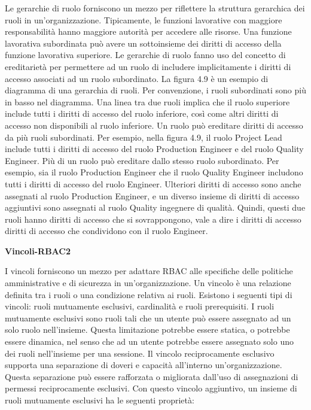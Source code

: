 Le gerarchie di ruolo forniscono un mezzo per riflettere la struttura gerarchica dei ruoli in un'organizzazione. Tipicamente, le funzioni lavorative con maggiore responsabilità hanno maggiore autorità per accedere alle risorse. Una funzione lavorativa subordinata può avere un sottoinsieme dei diritti di accesso della funzione lavorativa superiore. Le gerarchie di ruolo fanno uso del concetto di ereditarietà per permettere ad un ruolo di includere implicitamente i diritti di accesso associati ad un ruolo subordinato. La figura 4.9 è un esempio di diagramma di una gerarchia di ruoli. Per convenzione, i ruoli subordinati sono più in basso nel diagramma. Una linea tra due ruoli implica che il ruolo superiore include tutti i diritti di accesso del ruolo inferiore, così come altri diritti di accesso non disponibili al ruolo inferiore. Un ruolo può ereditare diritti di accesso da più ruoli subordinati. Per esempio, nella figura 4.9, il ruolo Project Lead include tutti i diritti di accesso del ruolo Production Engineer e del ruolo Quality Engineer. Più di un ruolo può ereditare dallo stesso ruolo subordinato. Per esempio, sia il ruolo Production Engineer che il ruolo Quality Engineer includono tutti i diritti di accesso del ruolo Engineer. Ulteriori diritti di accesso sono anche assegnati al ruolo Production Engineer, e un diverso insieme di diritti di accesso aggiuntivi sono assegnati al ruolo Quality ingegnere di qualità. Quindi, questi due ruoli hanno diritti di accesso che si sovrappongono, vale a dire i diritti di accesso diritti di accesso che condividono con il ruolo Engineer.

\begin{center}
    \textbf{Vincoli-RBAC2}
\end{center}

I vincoli forniscono un mezzo per adattare RBAC alle specifiche delle politiche amministrative e di sicurezza in un'organizzazione. Un vincolo è una relazione definita tra i ruoli o una condizione relativa ai ruoli. Esistono i seguenti tipi di vincoli: ruoli mutuamente esclusivi, cardinalità e ruoli prerequisiti. I ruoli mutuamente esclusivi sono ruoli tali che un utente può essere assegnato ad un solo ruolo nell'insieme. Questa limitazione potrebbe essere statica, o potrebbe essere dinamica, nel senso che ad un utente potrebbe essere assegnato solo uno dei ruoli nell'insieme per una sessione. Il vincolo reciprocamente esclusivo supporta una separazione di doveri e capacità all'interno un'organizzazione. Questa separazione può essere rafforzata o migliorata dall'uso di assegnazioni di permessi reciprocamente esclusivi. Con questo vincolo aggiuntivo, un insieme di ruoli mutuamente esclusivi ha le seguenti proprietà:

